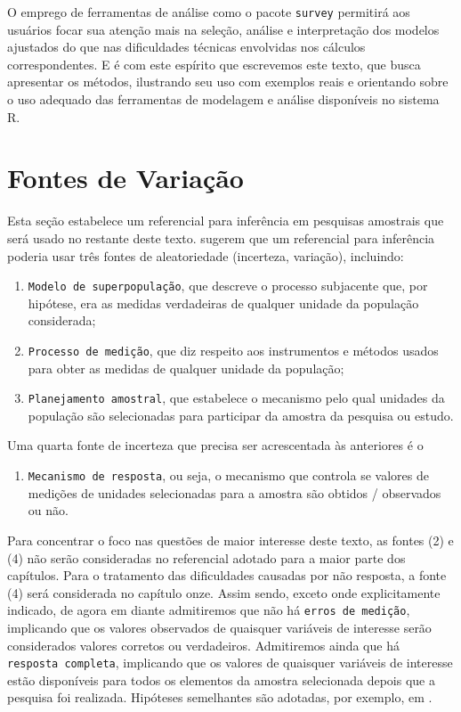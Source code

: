 \documentclass[]{book}
\providecommand{\tightlist}{%
  \setlength{\itemsep}{0pt}\setlength{\parskip}{0pt}}
\theoremstyle{definition}
\theoremstyle{definition}
\theoremstyle{definition}
\theoremstyle{remark}
\begin{document}
O emprego de ferramentas de análise como o pacote \texttt{survey}
permitirá aos usuários focar sua atenção mais na seleção, análise e
interpretação dos modelos ajustados do que nas dificuldades técnicas
envolvidas nos cálculos correspondentes. E é com este espírito que
escrevemos este texto, que busca apresentar os métodos, ilustrando seu
uso com exemplos reais e orientando sobre o uso adequado das ferramentas
de modelagem e análise disponíveis no sistema R.

\section{Fontes de Variação}\label{fontes-de-variacao}

Esta seção estabelece um referencial para inferência em pesquisas
amostrais que será usado no restante deste texto. \citep{cassel} sugerem
que um referencial para inferência poderia usar três fontes de
aleatoriedade (incerteza, variação), incluindo:

\begin{enumerate}
\def\labelenumi{\arabic{enumi}.}
\item
  \texttt{Modelo\ de\ superpopulação}, que descreve o processo
  subjacente que, por hipótese, era as medidas verdadeiras de qualquer
  unidade da população considerada;
\item
  \texttt{Processo\ de\ medição}, que diz respeito aos instrumentos e
  métodos usados para obter as medidas de qualquer unidade da população;
\item
  \texttt{Planejamento\ amostral}, que estabelece o mecanismo pelo qual
  unidades da população são selecionadas para participar da amostra da
  pesquisa ou estudo.
\end{enumerate}

Uma quarta fonte de incerteza que precisa ser acrescentada às anteriores
é o

\begin{enumerate}
\def\labelenumi{\arabic{enumi}.}
\setcounter{enumi}{3}
\tightlist
\item
  \texttt{Mecanismo\ de\ resposta}, ou seja, o mecanismo que controla se
  valores de medições de unidades selecionadas para a amostra são
  obtidos / observados ou não.
\end{enumerate}

Para concentrar o foco nas questões de maior interesse deste texto, as
fontes (2) e (4) não serão consideradas no referencial adotado para a
maior parte dos capítulos. Para o tratamento das dificuldades causadas
por não resposta, a fonte (4) será considerada no capítulo onze. Assim
sendo, exceto onde explicitamente indicado, de agora em diante
admitiremos que não há \texttt{erros\ de\ medição}, implicando que os
valores observados de quaisquer variáveis de interesse serão
considerados valores corretos ou verdadeiros. Admitiremos ainda que há
\texttt{resposta\ completa}, implicando que os valores de quaisquer
variáveis de interesse estão disponíveis para todos os elementos da
amostra selecionada depois que a pesquisa foi realizada. Hipóteses
semelhantes são adotadas, por exemplo, em \citep{Mont87}.
\end{document}
